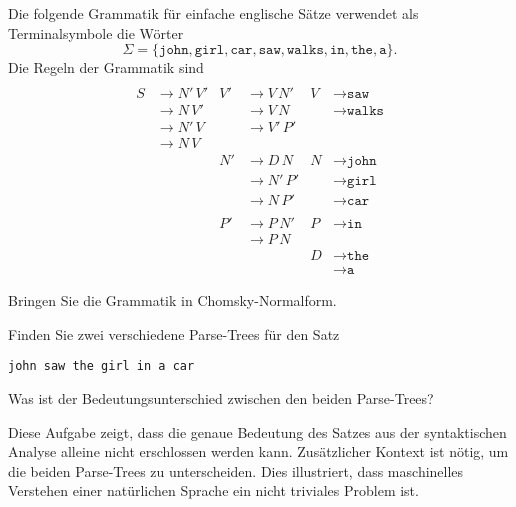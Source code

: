 Die folgende Grammatik für einfache englische Sätze verwendet
als Terminalsymbole die Wörter
\[
\Sigma
=
\{
\texttt{john},
\texttt{girl},
\texttt{car},
\texttt{saw},
\texttt{walks},
\texttt{in},
\texttt{the},
\texttt{a}
\}.
\]
Die Regeln der Grammatik sind
\begin{align*}
\\
S&\to N'\, V'
& V'&\to V\, N'
& V &\to \texttt{saw}
\\
  &\to N\, V'
  &&\to V\, N
  &&\to \texttt{walks}
\\
  &\to N'\, V
  &&\to V'\, P'
\\
 &\to N\, V
\\
  &
  &N'&\to D\, N
  &N &\to \texttt{john}
\\
  &&
  &\to N'\,P'
  &&\to \texttt{girl}
\\
  &
  &&\to N\, P'
  &&\to \texttt{car}
\\
\\
  &
  &P'&\to P\,N'
  &P&\to \texttt{in}
\\
  &
  &&\to P\, N
\\
  &
  &&
  &D&\to \texttt{the}
\\
  &
  &&
  &&\to \texttt{a}
\end{align*}
\begin{teilaufgaben}
\item
Bringen Sie die
Grammatik in Chomsky-Normalform.
\item
Finden Sie zwei verschiedene Parse-Trees für den Satz
\begin{center}
\texttt{john saw the girl in a car}
\end{center}
\item Was ist der Bedeutungsunterschied zwischen den beiden Parse-Trees?
\end{teilaufgaben}
Diese Aufgabe zeigt, dass die genaue Bedeutung des Satzes aus der
syntaktischen Analyse alleine nicht erschlossen werden kann.
Zusätzlicher Kontext ist nötig, um die beiden Parse-Trees zu unterscheiden.
Dies illustriert, dass maschinelles Verstehen einer natürlichen
Sprache ein nicht triviales Problem ist.

